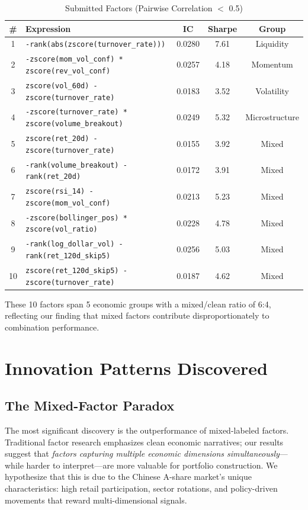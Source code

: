 \documentclass[11pt,a4paper]{ctexart}
\begin{document}
\begin{table}[H]
\centering
\caption{Submitted Factors (Pairwise Correlation $<$ 0.5)}
\label{tab:submitted}
\scriptsize
\begin{tabular}{clccc}
\toprule
\textbf{\#} & \textbf{Expression} & \textbf{IC} & \textbf{Sharpe} & \textbf{Group} \\
\midrule
1 & \texttt{-rank(abs(zscore(turnover\_rate)))} & 0.0280 & 7.61 & Liquidity \\
2 & \texttt{-zscore(mom\_vol\_conf) * zscore(rev\_vol\_conf)} & 0.0257 & 4.18 & Momentum \\
3 & \texttt{zscore(vol\_60d) - zscore(turnover\_rate)} & 0.0183 & 3.52 & Volatility \\
4 & \texttt{-zscore(turnover\_rate) * zscore(volume\_breakout)} & 0.0249 & 5.32 & Microstructure \\
5 & \texttt{zscore(ret\_20d) - zscore(turnover\_rate)} & 0.0155 & 3.92 & Mixed \\
6 & \texttt{-rank(volume\_breakout) - rank(ret\_20d)} & 0.0172 & 3.91 & Mixed \\
7 & \texttt{zscore(rsi\_14) - zscore(mom\_vol\_conf)} & 0.0213 & 5.23 & Mixed \\
8 & \texttt{-zscore(bollinger\_pos) * zscore(vol\_ratio)} & 0.0228 & 4.78 & Mixed \\
9 & \texttt{-rank(log\_dollar\_vol) - rank(ret\_120d\_skip5)} & 0.0256 & 5.03 & Mixed \\
10& \texttt{zscore(ret\_120d\_skip5) - zscore(turnover\_rate)} & 0.0187 & 4.62 & Mixed \\
\bottomrule
\end{tabular}
\end{table}

These 10 factors span 5 economic groups with a mixed/clean ratio of 6:4, reflecting our finding that mixed factors contribute disproportionately to combination performance.

\section{Innovation Patterns Discovered}

\subsection{The Mixed-Factor Paradox}
The most significant discovery is the outperformance of mixed-labeled factors. Traditional factor research emphasizes clean economic narratives; our results suggest that \textit{factors capturing multiple economic dimensions simultaneously}---while harder to interpret---are more valuable for portfolio construction. We hypothesize that this is due to the Chinese A-share market's unique characteristics: high retail participation, sector rotations, and policy-driven movements that reward multi-dimensional signals.
\end{document}
